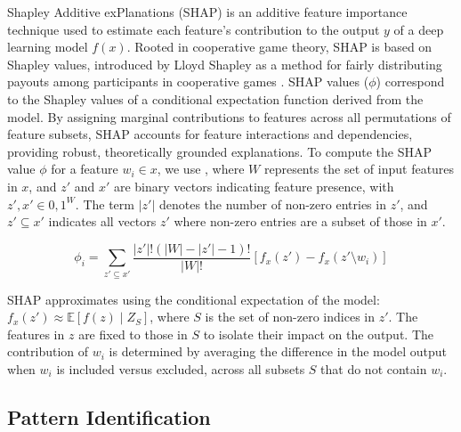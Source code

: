 Shapley Additive exPlanations (SHAP) \cite{NIPS2017_Lundberg} is an additive feature importance technique used to estimate each feature's contribution to the output $y$ of a deep learning model $f(x)$. Rooted in cooperative game theory, SHAP is based on Shapley values, introduced by Lloyd Shapley as a method for fairly distributing payouts among participants in cooperative games \cite{shapley:book1952}. SHAP values ($\phi$) correspond to the Shapley values of a conditional expectation function derived from the model. By assigning marginal contributions to features across all permutations of feature subsets, SHAP accounts for feature interactions and dependencies, providing robust, theoretically grounded explanations. To compute the SHAP value $\phi$ for a feature $w_i \in x$, we use , where $W$ represents the set of input features in $x$, and $z'$ and $x'$ are binary vectors indicating feature presence, with $z', x' \in {0,1}^W$. The term $|z'|$ denotes the number of non-zero entries in $z'$, and $z' \subseteq x'$ indicates all vectors $z'$ where non-zero entries are a subset of those in $x'$. 

\begin{equation}
\label{eq:shapley_values}
    \phi_i = \sum_{z' \subseteq x'} \frac{|z'|! (|W| - |z'| - 1)!}{|W|!} \left[f_x(z') - f_x(z' \setminus w_i) \right]
\end{equation}


SHAP approximates  using the conditional expectation of the model: $f_x(z') \approx \mathbb{E}[f(z) \mid Z_S]$, where $S$ is the set of non-zero indices in $z'$. The features in $z$ are fixed to those in $S$ to isolate their impact on the output. The contribution of $w_i$ is determined by averaging the difference in the model output when $w_i$ is included versus excluded, across all subsets $S$ that do not contain $w_i$.


\subsection{Pattern Identification}
\label{sec:npc_pattern_identification}


